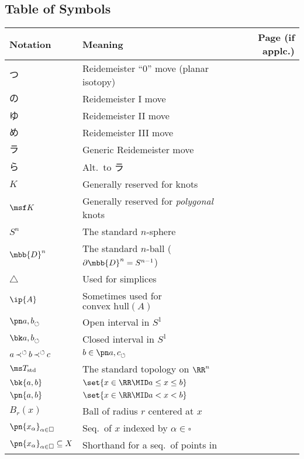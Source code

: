 \subsection*{Table of Symbols}
{\footnotesize
  \begin{longtable}{@{}llr@{}}
    \toprule Notation \hspace{2cm} & Meaning \hfill & Page (if applc.)
    \\ \midrule
    $つ$ & Reidemeister ``0'' move (planar isotopy) & \\
    $の$ & Reidemeister I move & \\
    $ゆ$ & Reidemeister II move & \\
    $め$ & Reidemeister III move & \\
    $ラ$ & Generic Reidemeister move \\
    $ら$ & Alt.\ to ラ & \\
    \midrule
    $K$ & Generally reserved for knots & \\
    $\msf K$ & Generally reserved for \emph{polygonal} knots & \\
    $S^n$ & The standard $n$-sphere & \\
    $\mbb{D}^n$ & The standard $n$-ball ($\partial \mbb{D}^n =
    S^{n-1}$) & \\
    $\triangle$ & Used for simplices & \\
    $\ip{A}$ & Sometimes used for $\text{convex hull}(A)$ & \\
    \midrule
    $\spn{a,b}$ & Open interval in $S^1$ & \pageref{sec:s1-notation} \\
    $\sbk{a,b}$ & Closed interval in $S^1$ & \pageref{sec:s1-notation}\\
    $a \operatorname{\operatorname*{\prec}^{\circlearrowleft}} b \operatorname{\operatorname*{\prec}^{\circlearrowleft}} c$ & $b \in \spn{a,c}$ & \pageref{sec:s1-notation} \\
    \midrule
    $\ms T_{\rm std}$ & The standard topology on $\RR^n$ & \\
    $\bk{a,b}$ & $\set{x \in \RR \MID a \leq x \leq b}$ & \\
    $\pn{a,b}$ & $\set{x \in \RR \MID a < x < b}$ & \\
    $B_r(x)$ & Ball of radius $r$ centered at $x$ & \\
    $\pn{x_{\alpha}}_{\alpha \in \square}$ & Seq.\ of $x$ indexed by
    $\alpha \in \square$ & \\
    $\pn{x_{\alpha}}_{\alpha \in \square} \subseteq X$ & Shorthand for
    a seq.\ of points in

\end{longtable}}
